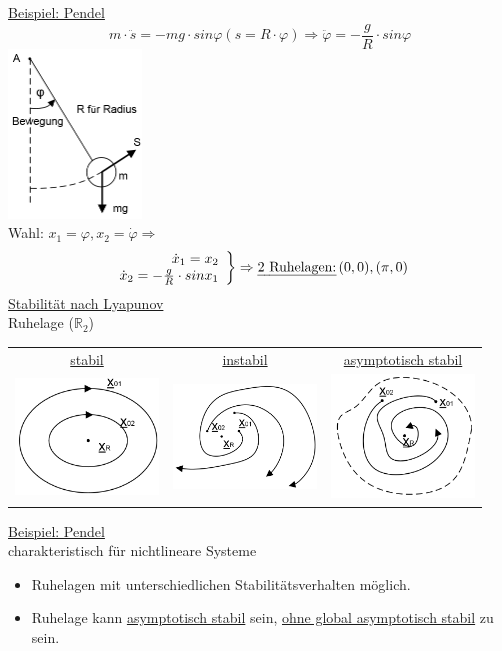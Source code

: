 \documentclass[openany,a4paper,11pt]{book}
\begin{document}
\uline{Beispiel: Pendel}
\[m\cdot\ddot{s}=-mg\cdot sin\varphi (s=R\cdot \varphi) \Rightarrow \ddot {\varphi}= -\frac{g}{R}\cdot sin\varphi\]
\includegraphics[width=1.4in]{imgs/NLR4.png}\\
Wahl: $x_1=\varphi, x_2=\dot{\varphi} \Rightarrow$
\[\left.
\begin{array}{r}
\dot{x}_1 = x_2\\
\dot{x}_2=-\frac{g}{R}\cdot sin{x_1}
\end{array}
\right\} \Rightarrow \text{\uline{2 Ruhelagen:}}\, (0,0), (\pi,0) \]
\uline{Stabilität nach Lyapunov}  \\
Ruhelage ($\mathbb{R}_2$)
\begin{table}[htbp]
    \centering
    \begin{tabular}{ccc}
     \uline{stabil} &\uline{instabil} & \uline{asymptotisch stabil}  \\
     \includegraphics[width=1.5in]{imgs/NLR5.png} & \includegraphics[width=1.5in]{imgs/NLR6.png} & \includegraphics[width=1.5in]{imgs/NLR7.png} \\
    \end{tabular}
\end{table}
\uline{Beispiel: Pendel}  \\
charakteristisch für nichtlineare Systeme
\begin{itemize}
    \item Ruhelagen mit unterschiedlichen Stabilitätsverhalten möglich.
    \item Ruhelage kann \uline{asymptotisch stabil} sein, \uline{ohne global asymptotisch stabil} zu sein.
\end{itemize}
\end{document}
